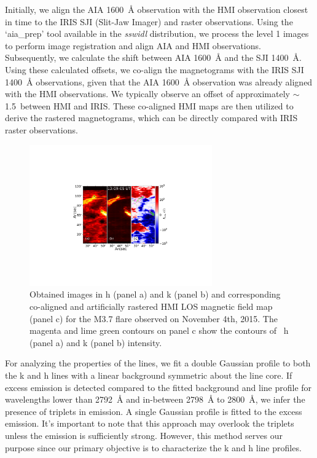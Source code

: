 Initially, we align the AIA 1600~{\AA} observation with the HMI observation closest in time to the IRIS SJI (Slit-Jaw Imager) and raster observations. Using the `aia\_prep' tool available in the \textit{sswidl} distribution, we process the level 1 images to perform image registration and align AIA and HMI observations. Subsequently, we calculate the shift between AIA 1600~{\AA} and the SJI 1400~{\AA}. Using these calculated offsets, we co-align the magnetograms with the IRIS SJI 1400~{\AA} observations, given that the AIA 1600~{\AA} observation was already aligned with the HMI observations. We typically observe an offset of approximately $\sim$ 1.5\arcsec~between HMI and IRIS. These co-aligned HMI maps are then utilized to derive the rastered magnetograms, which can be directly compared with IRIS raster observations.

\begin{figure}[ht!]
\centering  
\vspace{10cm}
\includegraphics[trim={7cm 5cm 6cm 15cm},width=0.7\textwidth]{Figures/m_flare_iris.pdf}
\caption{Obtained images in   h (panel a) and k (panel b) and corresponding co-aligned and artificially rastered HMI LOS magnetic field map (panel c) for the M3.7 flare observed on November 4th, 2015. The magenta and lime green contours on panel c show the contours of  ~h (panel a) and k (panel b) intensity.} \label{fig:aligned_raster}
\end{figure}

For analyzing the properties of the   lines, we fit a double Gaussian profile to both the k and h lines with a linear background symmetric about the line core. If excess emission is detected compared to the fitted background and line profile for wavelengths lower than 2792~{\AA} and in-between 2798~{\AA} to 2800~{\AA}, we infer the presence of   triplets in emission. A single Gaussian profile is fitted to the excess emission. It's important to note that this approach may overlook the triplets unless the emission is sufficiently strong. However, this method serves our purpose since our primary objective is to characterize the   k and h line profiles.

